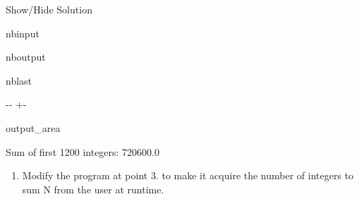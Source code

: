 \documentclass[letterpaper,10pt,english]{sphinxmanual}
\begin{document}
\sphinxAtStartPar
Show/Hide Solution





\begin{sphinxuseclass}{nbinput}
{
\begin{sphinxVerbatim}[commandchars=\\\{\}]
\llap{\color{nbsphinxin}[21]:\,\hspace{\fboxrule}\hspace{\fboxsep}}  

 
\end{sphinxVerbatim}
}

\end{sphinxuseclass}
\begin{sphinxuseclass}{nboutput}
\begin{sphinxuseclass}{nblast}
{

\kern-\sphinxverbatimsmallskipamount\kern-\baselineskip
\kern+\FrameHeightAdjust\kern-\fboxrule
\vspace{\nbsphinxcodecellspacing}

\begin{sphinxuseclass}{output_area}
\begin{sphinxuseclass}{}


\begin{sphinxVerbatim}[commandchars=\\\{\}]
Sum of first 1200 integers:  720600.0
\end{sphinxVerbatim}



\end{sphinxuseclass}
\end{sphinxuseclass}
}

\end{sphinxuseclass}
\end{sphinxuseclass}

\begin{enumerate}
%
\setcounter{enumi}{3}
\item {} 
\sphinxAtStartPar
Modify the program at point 3. to make it acquire the number of integers to sum N from the user at runtime.

\end{enumerate}
\end{document}
